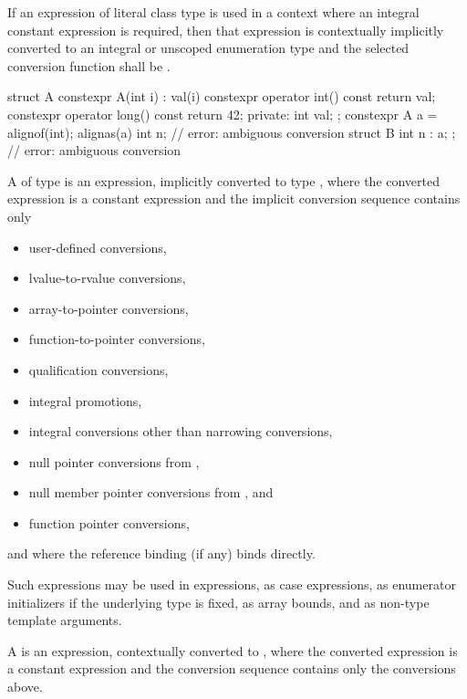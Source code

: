 \pnum
If an expression of literal class type is used in a context where an
integral constant expression is required, then that expression is
contextually implicitly converted to an integral or unscoped
enumeration type
and the selected conversion function shall be .
\begin{example}
\begin{codeblock}
struct A {
  constexpr A(int i) : val(i) { }
  constexpr operator int() const { return val; }
  constexpr operator long() const { return 42; }
private:
  int val;
};
constexpr A a = alignof(int);
alignas(a) int n;               // error: ambiguous conversion
struct B { int n : a; };        // error: ambiguous conversion
\end{codeblock}
\end{example}

\pnum
A 
of type  is an
expression, implicitly converted to type , where
the converted expression is a constant expression and the
implicit conversion sequence contains only
\begin{itemize}
\item user-defined conversions,
\item lvalue-to-rvalue conversions,
\item array-to-pointer conversions,
\item function-to-pointer conversions,
\item qualification conversions,
\item integral promotions,
\item integral conversions other than narrowing conversions,
\item null pointer conversions from ,
\item null member pointer conversions from , and
\item function pointer conversions,
\end{itemize}
and where the reference binding (if any) binds directly.
\begin{note}
Such expressions may be used in 
expressions, as case expressions,
as enumerator initializers if the underlying type is
fixed, as array bounds, and
as non-type template
arguments.
\end{note}
%
%
A  is
an expression, contextually converted to ,
where the converted expression is a constant expression and
the conversion sequence contains only the conversions above.


